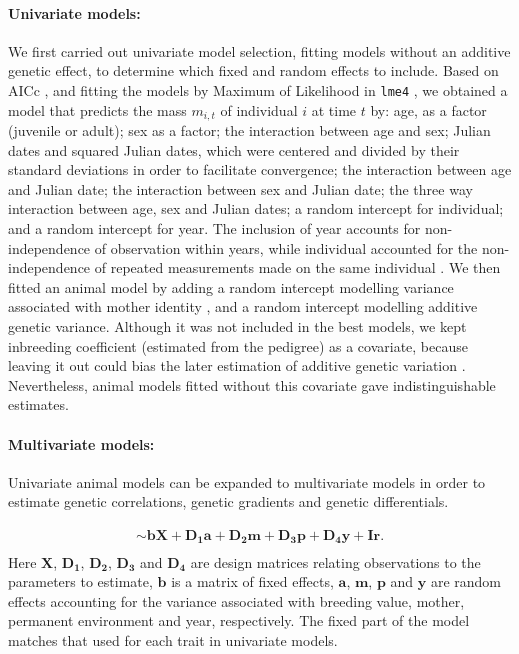\paragraph{Univariate models: }
We first carried out univariate model selection, fitting models without an additive genetic effect, to determine which fixed and random effects to include. Based on AICc \parencite{Burnham2002c}, and fitting the models by Maximum of Likelihood in \verb+lme4+ \parencite{Bates2014a}, we obtained a model that predicts the mass $m_{i,t}$ of individual $i$ at time $t$ by: age, as a factor (juvenile or adult); sex as a factor; the interaction between age and sex; Julian dates and squared Julian dates, which were centered and divided by their standard deviations in order to facilitate convergence; the interaction between age and Julian date; the interaction between sex and Julian date; the three way interaction between age, sex and Julian dates; a random intercept for individual; and a random intercept for year. The inclusion of year accounts for non-independence of observation within years, while individual accounted for the non-independence of repeated measurements made on the same individual \parencite{Kruuk2007}. 
We then fitted an animal model by adding a random intercept modelling variance associated with mother identity \parencite{Kruuk2004}, and a random intercept modelling additive genetic variance. Although it was not included in the best models, we kept inbreeding coefficient (estimated from the pedigree) as a covariate, because leaving it out could bias the later estimation of additive genetic variation \parencite{deBoer1993}. Nevertheless, animal models fitted without this covariate gave indistinguishable estimates.

\paragraph{Multivariate models: }
Univariate animal models can be expanded to multivariate models in order to estimate genetic correlations, genetic gradients and genetic differentials.

\begin{align*}
[\boldsymbol{m},
\boldsymbol{l},
\boldsymbol{t},
\boldsymbol{\omega}]
\sim
\boldsymbol{bX}+\boldsymbol{D_1a}+\boldsymbol{D_2m}+\boldsymbol{D_3p}+\boldsymbol{D_4y}+\boldsymbol{Ir.}\\
\end{align*}
Here $\boldsymbol{X}$, $\boldsymbol{D_1}$, $\boldsymbol{D_2}$, $\boldsymbol{D_3}$ and $\boldsymbol{D_4}$ are design matrices relating observations to the parameters to estimate, $\boldsymbol{b}$ is a matrix of fixed effects, $\boldsymbol{a}$, $\boldsymbol{m}$, $\boldsymbol{p}$ and $\boldsymbol{y}$ are random effects accounting for the variance associated with breeding value, mother, permanent environment and year, respectively. The fixed part of the model matches that used for each trait in univariate models.

